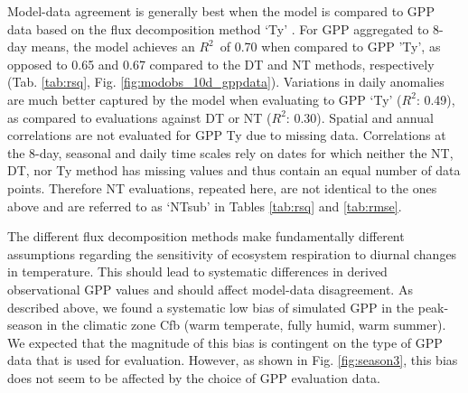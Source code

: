 \documentclass{myreport}
\newcommand{\rsq}{$R^2$}
\begin{document}
Model-data agreement is generally best when the model is compared to GPP data based on the flux decomposition method `Ty' \citep{wang17natpl}. For GPP aggregated to 8-day means, the model achieves an \rsq\ of 0.70 when compared to GPP 'Ty', as opposed to 0.65 and 0.67 compared to the DT and NT methods, respectively (Tab. \ref{tab:rsq}, Fig. \ref{fig:modobs_10d_gppdata}). Variations in daily anomalies are much better captured by the model when evaluating to GPP `Ty' (\rsq : 0.49), as compared to evaluations against DT or NT (\rsq : 0.30). Spatial and annual correlations are not evaluated for GPP Ty due to missing data. Correlations at the 8-day, seasonal and daily time scales rely on dates for which neither the NT, DT, nor Ty method has missing values and thus contain an equal number of data points. Therefore NT evaluations, repeated here, are not identical to the ones above and are referred to as `NTsub' in Tables \ref{tab:rsq} and \ref{tab:rmse}. 

The different flux decomposition methods make fundamentally different assumptions regarding the sensitivity of ecosystem respiration to diurnal changes in temperature. This should lead to systematic differences in derived observational GPP values and should affect model-data disagreement. As described above, we found a systematic low bias of simulated GPP in the peak-season in the climatic zone Cfb (warm temperate, fully humid, warm summer). We expected that the magnitude of this bias is contingent on the type of GPP data that is used for evaluation. However, as shown in Fig. \ref{fig:season3}, this bias does not seem to be affected by the choice of GPP evaluation data.
\end{document}
